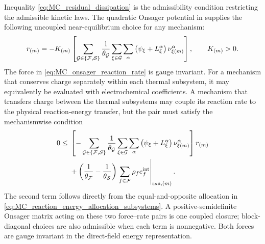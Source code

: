 Inequality \eqref{eq:MC_residual_dissipation} is the admissibility condition
restricting the admissible kinetic laws.  The quadratic Onsager potential in
 supplies the following uncoupled
near-equilibrium choice for any mechanism:
%
\begin{equation}
	r_{(m)}
	=
	-K_{(m)}
	\left[
		\sum_{\mathcal{G}\in\{\mathcal{F},\mathcal{S}\}}
		\frac{1}{\theta_{\mathcal{G}}}
		\sum_{\xi\in\mathcal{G}}\sum_\alpha
		\left(
		\psi_\xi+L_\xi^\alpha
		\right)
		\nu_{\xi (m)}^\alpha
		\right],
	\qquad
	K_{(m)}>0 .
	\label{eq:MC_onsager_reaction_rate}
\end{equation}
%
The force in \eqref{eq:MC_onsager_reaction_rate} is gauge invariant.  For a
mechanism that conserves charge separately within each thermal subsystem, it
may equivalently be evaluated with electrochemical coefficients.  A mechanism
that transfers charge between the thermal subsystems may couple its reaction
rate to the physical reaction-energy transfer, but the pair must satisfy the
mechanismwise condition
%
\begin{align}
	0\le{}&
	\left[
		-
		\sum_{\mathcal{G}\in\{\mathcal{F},\mathcal{S}\}}
		\frac{1}{\theta_{\mathcal{G}}}
		\sum_{\xi\in\mathcal{G}}\sum_\alpha
		\left(
		\psi_\xi+L_\xi^\alpha
		\right)
		\nu_{\xi (m)}^\alpha
				\right]r_{(m)}
	\notag \\
	&+
	\left(
		\frac{1}{\theta_{\mathcal{F}}}
		-
		\frac{1}{\theta_{\mathcal{S}}}
	\right)
	\left.
	\sum_{f\in\mathcal{F}}\rho_f e_f^{\rm int}
	\right\vert_{{\rm rxn},(m)} .
	\label{eq:MC_reaction_energy_coupled_admissibility}
\end{align}
%
The second term follows directly from the equal-and-opposite allocation in
\eqref{eq:MC_reaction_energy_allocation_subsystems}.  A positive-semidefinite
Onsager matrix acting on these two force--rate pairs is one coupled closure;
block-diagonal choices are also admissible when each term is nonnegative.
Both forces are gauge invariant in the direct-field energy representation.

